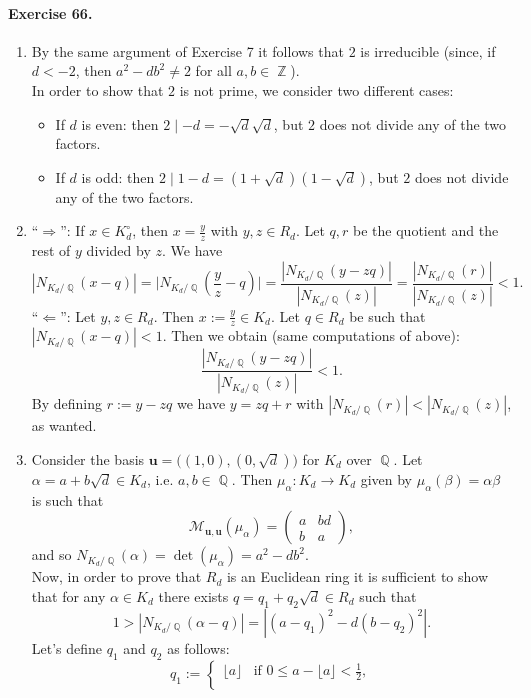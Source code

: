 \documentclass[12pt,a4paper]{report}
\theoremstyle{definition}
\theoremstyle{num.custom-title}
\DeclareMathOperator{\Q}{\mathbb{Q}}
\DeclareMathOperator{\Z}{\mathbb{Z}}
\DeclareMathOperator{\imp}{\Rightarrow}
\begin{document}
\paragraph{Exercise 66.}
\begin{enumerate}
\item By the same argument of Exercise 7 it follows that $2$ is irreducible (since, if $d<-2$, then $a^2-db^2 \neq 2$ for all $a,b \in \Z$).\\
In order to show that $2$ is not prime, we consider two different cases:
\begin{itemize}
\item If $d$ is even: then $2 \mid -d = -\sqrt{d}\sqrt{d}$, but $2$ does not divide any of the two factors.
\item If $d$ is odd: then $2 \mid 1-d = (1+\sqrt{d})(1-\sqrt{d})$, but $2$ does not divide any of the two factors.
\end{itemize}
\item ``$\imp$'': If $x \in K_d^\circ$, then $x=\frac{y}{z}$ with $y,z \in R_d$. Let $q,r$ be the quotient and the rest of $y$ divided by $z$. We have
\[
|N_{K_d/\Q}(x-q)| = \Big| N_{K_d/\Q} \left( \frac{y}{z}-q \right) \Big| = \frac{|N_{K_d/\Q}(y-zq)|}{|N_{K_d/\Q}(z)|} = \frac{|N_{K_d/\Q}(r)|}{|N_{K_d/\Q}(z)|} <1.
\]
``$\Leftarrow$'': Let $y,z \in R_d$. Then $x := \frac{y}{z} \in K_d$. Let $q \in R_d$ be such that $|N_{K_d/\Q}(x-q)|<1$. Then we obtain (same computations of above):
\[
\frac{|N_{K_d/\Q}(y-zq)|}{|N_{K_d/\Q}(z)|} <1.
\]
By defining $r:=y-zq$ we have $y=zq+r$ with $|N_{K_d/\Q}(r)|<|N_{K_d/\Q}(z)|$, as wanted.
\item Consider the basis $\mathbf{u} = \big( (1,0),(0,\sqrt{d}) \big)$ for $K_d$ over $\Q$. Let $\alpha = a+b\sqrt{d} \in K_d$, i.e. $a,b \in \Q$. Then $\mu_\alpha : K_d \to K_d$ given by $\mu_\alpha(\beta)=\alpha\beta$ is such that
\[
\mathcal M_{\mathbf{u},\mathbf{u}}(\mu_\alpha) = 
\begin{pmatrix}
a & bd \\
b & a
\end{pmatrix},
\]
and so
$N_{K_d/\Q}(\alpha) = \det(\mu_\alpha) = a^2 - db^2$. \\
Now, in order to prove that $R_d$ is an Euclidean ring it is sufficient to show that for any $\alpha \in K_d$ there exists $q = q_1 + q_2\sqrt{d} \in R_d$ such that
\[
1> |N_{K_d/\Q}(\alpha-q)| = |(a-q_1)^2 - d (b-q_2)^2|.
\]
Let's define $q_1$ and $q_2$ as follows:
\[
q_1 :=
\begin{cases}
\lfloor a \rfloor & \text{if } 0 \leq a - \lfloor a \rfloor < \frac{1}{2}, \\

\end{cases}\]
\end{enumerate}
\end{document}
